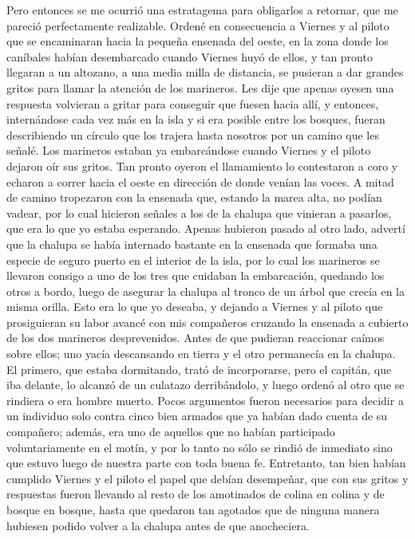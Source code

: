 \documentclass{novela}
\begin{document}
    Pero entonces se me ocurrió una estratagema para obligarlos a retornar, que me pareció perfectamente realizable. Ordené en consecuencia a Viernes y al piloto que se encaminaran hacia la pequeña ensenada del oeste, en la zona donde los caníbales habían desembarcado cuando Viernes huyó de ellos, y tan pronto llegaran a un altozano, a una media milla de distancia, se pusieran a dar grandes gritos para llamar la atención de los marineros. Les dije que apenas oyesen una respuesta volvieran a gritar para conseguir que fuesen hacia allí, y entonces, internándose cada vez más en la isla y si era posible entre los bosques, fueran describiendo un círculo que los trajera hasta nosotros por un camino que les señalé.
    Los marineros estaban ya embarcándose cuando Viernes y el piloto dejaron oír sus gritos. Tan pronto oyeron el llamamiento lo contestaron a coro y echaron a correr hacia el oeste en dirección de donde venían las voces. A mitad de camino tropezaron con la ensenada que, estando la marea alta, no podían vadear, por lo cual hicieron señales a los de la chalupa que vinieran a pasarlos, que era lo que yo estaba esperando.
    Apenas hubieron pasado al otro lado, advertí que la chalupa se había internado bastante en la ensenada que formaba una especie de seguro puerto en el interior de la isla, por lo cual los marineros se llevaron consigo a uno de los tres que cuidaban la embarcación, quedando los otros a bordo, luego de asegurar la chalupa al tronco de un árbol que crecía en la misma orilla.
    Esto era lo que yo deseaba, y dejando a Viernes y al piloto que prosiguieran su labor avancé con mis compañeros cruzando la ensenada a cubierto de los dos marineros desprevenidos.
    Antes de que pudieran reaccionar caímos sobre ellos; uno yacía descansando en tierra y el otro permanecía en la chalupa. El primero, que estaba dormitando, trató de incorporarse, pero el capitán, que iba delante, lo alcanzó de un culatazo derribándolo, y luego ordenó al otro que se rindiera o era hombre muerto.
    Pocos argumentos fueron necesarios para decidir a un individuo solo contra cinco bien armados que ya habían dado cuenta de su compañero; además, era uno de aquellos que no habían participado voluntariamente en el motín, y por lo tanto no sólo se rindió de inmediato sino que estuvo luego de nuestra parte con toda buena fe.
    Entretanto, tan bien habían cumplido Viernes y el piloto el papel que debían desempeñar, que con sus gritos y respuestas fueron llevando al resto de los amotinados de colina en colina y de bosque en bosque, hasta que quedaron tan agotados que de ninguna manera hubiesen podido volver a la chalupa antes de que anocheciera.
\end{document}
